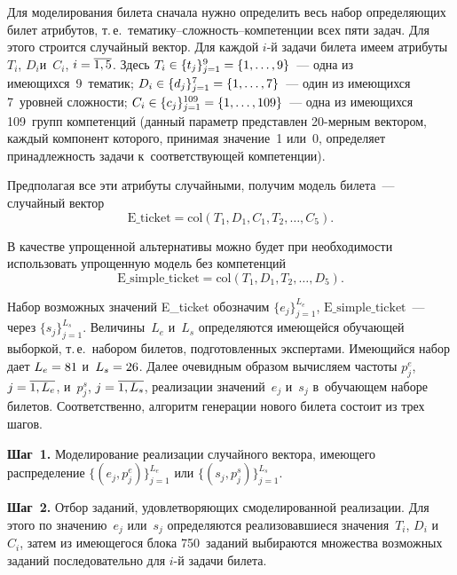 \begin{multicols}{2}
 
  
  Для моделирования билета сначала нужно определить весь набор 
определяющих билет атрибутов, т.\,е.\  
те\-ма\-ти\-ку--слож\-ность--ком\-пе\-тен\-ции всех пяти задач. Для этого 
строится случайный вектор. Для каждой $i$-й задачи билета имеем атрибуты 
  $T_i$, $D_i$\linebreak и~$C_i$, $i\hm= \overline{1, 5}$. Здесь
  $T_i\hm\in \{t_j\}^9_{j=1}=\{1,\ldots , 9\}$~--- одна из  
име\-ющих\-ся~9~тематик;
  $D_i\hm\in \{d_j\}^7_{j=1}\hm= \{1,\ldots , 7\}$~--- один из имеющихся 
7~уровней слож\-ности;
  $C_i\hm\in \{c_j\}^{109}_{j=1}\hm= \{1, \ldots , 109\}$~--- одна из\linebreak  
име\-ющих\-ся 109~групп компетенций (данный параметр представлен  
20-мер\-ным вектором, каждый компонент которого, принимая значение~1 
или~0, определяет при\-над\-леж\-ность задачи к~соответствующей 
компетенции).
  
  Предполагая все эти атрибуты случайными, получим модель билета~--- 
случайный вектор
  \begin{equation}
  \mathrm{E\_{ticket}} =\mathrm{col}\left( T_1, D_1, C_1, T_2, \ldots, C_5\right).
  \label{e1-bos}
  \end{equation}
  
  В качестве упрощенной альтернативы можно будет при необходимости 
использовать упрощенную модель без компетенций
  \begin{equation}
  \mathrm{E\_{simple}\_ticket} =\mathrm{col}\left( T_1, D_1, T_2, \ldots , D_5\right).
  \label{e2-bos}
  \end{equation}
  
  Набор возможных значений E\_ticket обозначим $\{e_j\}^{L_e}_{j=1}$, 
$\mathrm{E\_simple\_ticket}$~--- через $\{s_j\}_{j=1}^{L_s}$. Величины~$L_e$ и~$L_s$ 
определяются име\-ющей\-ся обуча\-ющей выборкой, т.\,е.\ набором билетов, 
подготовленных экспертами. Имеющийся набор дает $L_e\hm=81$ и~$L_s\hm= 
26$. Далее очевидным образом вычисляем частоты $p_j^e$, $j\hm= \overline{1,L_e}$,  и~$p_j^s$, $j\hm= \overline{1, L_s}$, реализации значений~$e_j$ и~$s_j$ 
в~обуча\-ющем наборе билетов. Соответственно, алгоритм генерации нового 
билета состоит из трех шагов.
  
\textbf{Шаг~1.} Моделирование реализации случайного вектора, имеющего 
распределение $\{ (e_j,p_j^e)\}^{L_e}_{j=1}$ или $\{( s_j,p_j^s)\}^{L_s}_{j=1}$.
  
  \textbf{Шаг~2.} Отбор заданий, удовлетворяющих смоделированной реализации. 
Для этого по значению~$e_j$ или~$s_j$ определяются реализовавшиеся 
значения~$T_i$, $D_i$ и~$C_i$, затем из имеющегося блока 750~заданий 
выбираются множества возможных заданий последовательно для $i$-й 
задачи билета.
  

\end{multicols}
